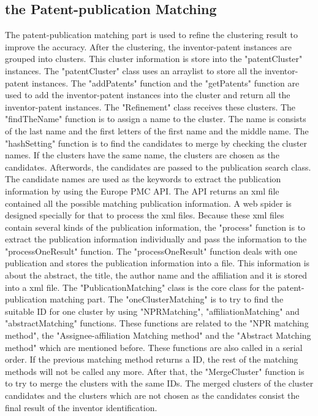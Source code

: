\subsection{the Patent-publication Matching}
The patent-publication matching part is used to refine the clustering result to improve the accuracy. After the clustering, the inventor-patent instances are grouped into clusters. This cluster information is store into the "patentCluster" instances. The "patentCluster" class uses an arraylist to store all the inventor-patent instances. The "addPatents" function and the "getPatents" function are used to add the inventor-patent instances into the cluster and return all the inventor-patent instances. The "Refinement" class receives these clusters. The "findTheName" function is to assign a name to the cluster. The name is consists of the last name and the first letters of the first name and the middle name. The "hashSetting" function is to find the candidates to merge by checking the cluster names. If the clusters have the same name, the clusters are chosen as the candidates. Afterwords, the candidates are passed to the publication search class. The candidate names are used as the keywords to extract the publication information by using the Europe PMC API.  The API returns an xml file contained all the possible matching publication information. A web spider is designed specially for that to process the xml files. Because these xml files contain several kinds of the publication information, the "process" function is to extract the publication information individually and pass the information to the "processOneResult" function. The "processOneResult" function deals with one publication and stores the publication information into a file. This information is about the abstract, the title, the author name and the affiliation and it is stored into a xml file. The "PublicationMatching" class is the core class for the patent-publication matching part. The "oneClusterMatching" is to try to find the suitable ID for one cluster by using "NPRMatching", "affiliationMatching"  and  "abstractMatching" functions.  These functions are related to the  "NPR matching method", the "Assignee-affiliation Matching method" and the "Abstract Matching method" which are mentioned before. These functions are also called in a serial order. If the previous matching method returns a ID, the rest of the matching methods will not be called any more.  After that, the "MergeCluster" function is to try to merge the clusters with the same IDs. The merged clusters of the cluster candidates and the clusters which are not chosen as the candidates consist the final result of the inventor identification.







